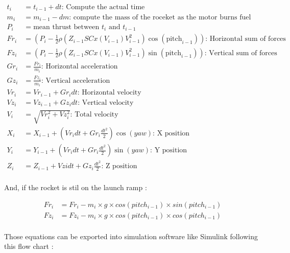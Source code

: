 \begin{align*}
    t_i  & = t_{i-1} + dt \text{: Compute the actual time}                                                                      \\
    m_i  & = m_{i-1} - dm \text{: compute the mass of the roceket as the motor burns fuel}                                      \\
    P_i  & = \text{mean thrust between $t_i$ and $t_{i-1}$}                                                                     \\
    Fr_i & = (P_i - \frac{1}{2}\rho(Z_{i-1}SCx(V_{i-1})V^2_{i-1}) \cos({\text{pitch}_{i-1}})) \text{: Horizontal sum of forces} \\
    Fz_i & = (P_i - \frac{1}{2}\rho(Z_{i-1}SCx(V_{i-1})V^2_{i-1}) \sin({\text{pitch}_{i-1}})) \text{: Vertical sum of forces}   \\
    Gr_i & = \frac{Fr_i}{m_i} \text{: Horizontal acceleration}                                                                  \\
    Gz_i & = \frac{Fz_i}{m_i} \text{: Vertical acceleration}                                                                    \\
    Vr_i & = Vr_{i-1} + Gr_i dt \text{: Horizontal velocity}                                                                    \\
    Vz_i & = Vz_{i-1} + Gz_i dt \text{: Vertical velocity}                                                                      \\
    V_i  & = \sqrt{Vr_i^2 + Vz_i^2} \text{: Total velocity}                                                                     \\
    X_i  & = X_{i-1} + (Vr_i dt + Gr_i \frac{dt^2}{2}) \cos({yaw})\text{: X position}                                           \\
    Y_i  & = Y_{i-1} + (Vr_i dt + Gr_i \frac{dt^2}{2}) \sin({yaw}) \text{: Y position}                                          \\
    Z_i  & = Z_{i-1} + Vzi dt + Gz_i \frac{dt^2}{2} \text{: Z position}                                                         \\
\end{align*}

And, if the rocket is stil on the launch ramp :

\begin{align*}
    Fr_i & = Fr_i - m_i \times g \times cos({pitch_{i-1}}) \times sin({pitch_{i-1}}) \\
    Fz_i & = Fz_i - m_i \times g \times cos({pitch_{i-1}}) \times cos({pitch_{i-1}}) \\
\end{align*}

Those equations can be exported into simulation software like Simulink
following this flow chart :


